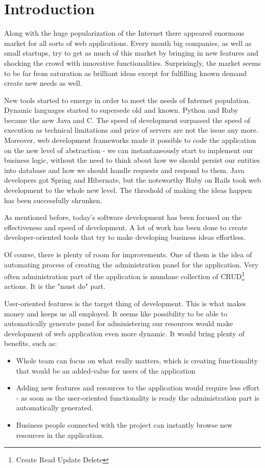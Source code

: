 
\chapter{Introduction}
  Along with the huge popularization of the Internet there appeared enormous market for all sorts of web applications. Every month big companies, as well as small startups, try to get as much of this market by bringing in new features and shocking the crowd with innovative functionalities. Surprisingly, the market seems to be far from saturation as brilliant ideas except for fulfilling known demand create new needs as well.

  New tools started to emerge in order to meet the needs of Internet population. Dynamic languages started to supersede old and known. Python and Ruby became the new Java and C. The speed of development surpassed the speed of execution as technical limitations and price of servers are not the issue any more. Moreover, web development frameworks made it possible to code the application on the new level of abstraction - we can instantaneously start to implement our business logic, without the need to think about how we should persist our entities into database and how we should handle requests and respond to them. Java developers got Spring and Hibernate, but the noteworthy Ruby on Rails took web development to the whole new level. The threshold of making the ideas happen has been successfully shrunken.
  
  As mentioned before, today's software development has been focused on the effectiveness and speed of development. A lot of work has been done to create developer-oriented tools that try to make developing business ideas effortless.
  
  Of course, there is plenty of room for improvements. One of them is the idea of automating process of creating the administration panel for the application. Very often administration part of the application is mundane collection of CRUD\footnote{Create Read Update Delete} actions. It is the "must do" part. 
  
   User-oriented features is the target thing of development. This is what makes money and keeps us all employed. It seems like possibility to be able to automatically generate panel for administering our resources would make development of web application even more dynamic. It would bring plenty of benefits, such as:
  
  \begin{itemize}
	  \item Whole team can focus on what really matters, which is creating functionality that would be an added-value for users of the application
	  \item Adding new features and resources to the application would require less effort - as soon as the user-oriented functionality is ready the administration part is automatically generated.
	  \item Business people connected with the project can instantly browse new resources in the application.
	\end{itemize}
  
